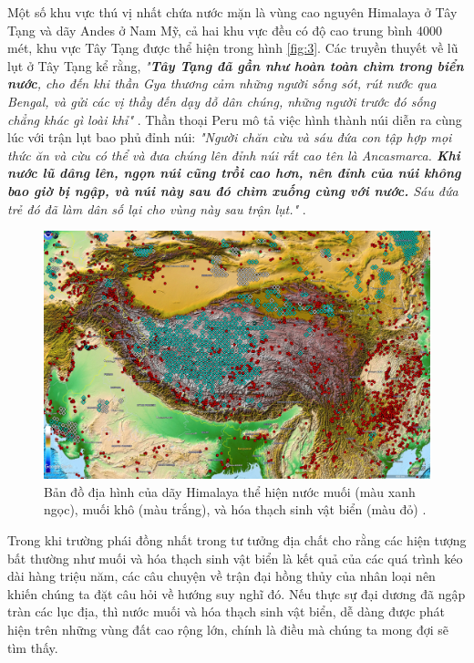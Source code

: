 \documentclass[10pt,twocolumn,letterpaper]{article}
\begin{document}
Một số khu vực thú vị nhất chứa nước mặn là vùng cao nguyên Himalaya ở Tây Tạng và dãy Andes ở Nam Mỹ, cả hai khu vực đều có độ cao trung bình 4000 mét, khu vực Tây Tạng được thể hiện trong hình \ref{fig:3}. Các truyền thuyết về lũ lụt ở Tây Tạng kể rằng, \textit{"\textbf{Tây Tạng đã gần như hoàn toàn chìm trong biển nước}, cho đến khi thần Gya thương cảm những người sống sót, rút nước qua Bengal, và gửi các vị thầy đến dạy dỗ dân chúng, những người trước đó sống chẳng khác gì loài khỉ"} \cite{3}. Thần thoại Peru mô tả việc hình thành núi diễn ra cùng lúc với trận lụt bao phủ đỉnh núi: \textit{"Người chăn cừu và sáu đứa con tập hợp mọi thức ăn và cừu có thể và đưa chúng lên đỉnh núi rất cao tên là Ancasmarca. \textbf{Khi nước lũ dâng lên, ngọn núi cũng trồi cao hơn, nên đỉnh của núi không bao giờ bị ngập, và núi này sau đó chìm xuống cùng với nước.} Sáu đứa trẻ đó đã làm dân số lại cho vùng này sau trận lụt."} \cite{3}.
\begin{figure}[t]
\begin{center}
   \includegraphics[width=1\linewidth]{tibet.jpg}
\end{center}
   \caption{Bản đồ địa hình của dãy Himalaya thể hiện nước muối (màu xanh ngọc), muối khô (màu trắng), và hóa thạch sinh vật biển (màu đỏ) \cite{15,16,86,87}.}
\label{fig:3}
\label{fig:onecol}
\end{figure}

Trong khi trường phái đồng nhất trong tư tưởng địa chất cho rằng các hiện tượng bất thường như muối và hóa thạch sinh vật biển là kết quả của các quá trình kéo dài hàng triệu năm, các câu chuyện về trận đại hồng thủy của nhân loại nên khiến chúng ta đặt câu hỏi về hướng suy nghĩ đó. Nếu thực sự đại dương đã ngập tràn các lục địa, thì nước muối và hóa thạch sinh vật biển, dễ dàng được phát hiện trên những vùng đất cao rộng lớn, chính là điều mà chúng ta mong đợi sẽ tìm thấy.
\end{document}
